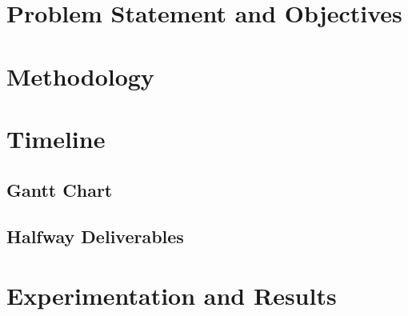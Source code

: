 \documentclass[english]{upeeei}
\begin{document}
\chapter{Problem Statement and Objectives}

\chapter{Methodology}

\chapter{Timeline}
\section{Gantt Chart}
\section{Halfway Deliverables}

\chapter{Experimentation and Results}
\printbibliography[
heading=bibintoc,
title={Bibliography}
]
\end{document}
